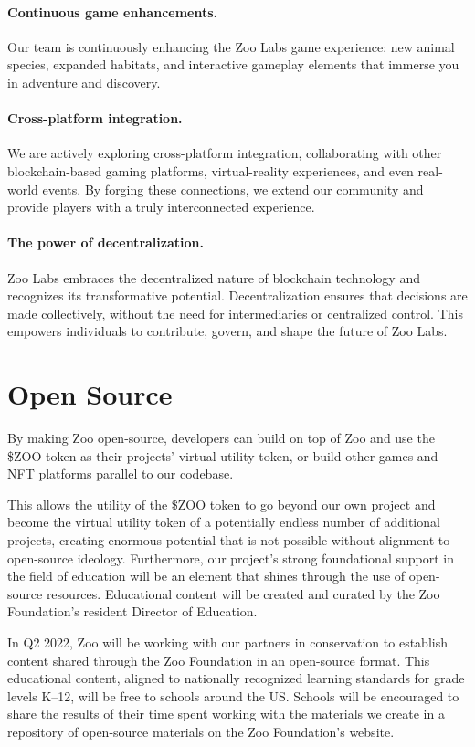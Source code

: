\paragraph{Continuous game enhancements.} Our team is continuously enhancing the Zoo Labs game experience: new animal species, expanded habitats, and interactive gameplay elements that immerse you in adventure and discovery.

\paragraph{Cross-platform integration.} We are actively exploring cross-platform integration, collaborating with other blockchain-based gaming platforms, virtual-reality experiences, and even real-world events. By forging these connections, we extend our community and provide players with a truly interconnected experience.

\paragraph{The power of decentralization.} Zoo Labs embraces the decentralized nature of blockchain technology and recognizes its transformative potential. Decentralization ensures that decisions are made collectively, without the need for intermediaries or centralized control. This empowers individuals to contribute, govern, and shape the future of Zoo Labs.

\section{Open Source}
\label{sec:open-source}

By making Zoo open-source, developers can build on top of Zoo and use the \$ZOO token as their projects' virtual utility token, or build other games and NFT platforms parallel to our codebase.

This allows the utility of the \$ZOO token to go beyond our own project and become the virtual utility token of a potentially endless number of additional projects, creating enormous potential that is not possible without alignment to open-source ideology. Furthermore, our project's strong foundational support in the field of education will be an element that shines through the use of open-source resources. Educational content will be created and curated by the Zoo Foundation's resident Director of Education.

In Q2 2022, Zoo will be working with our partners in conservation to establish content shared through the Zoo Foundation in an open-source format. This educational content, aligned to nationally recognized learning standards for grade levels K--12, will be free to schools around the US. Schools will be encouraged to share the results of their time spent working with the materials we create in a repository of open-source materials on the Zoo Foundation's website.

